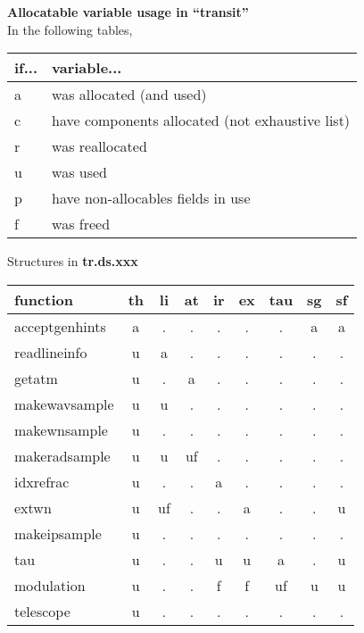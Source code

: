 \documentclass{article}
\begin{document}
\begin{center}
{\large {\bf Allocatable variable usage in ``transit''}}\\[1cm]
In the following tables, \\
\begin{tabular}{ll}
if... & variable...\\
\hline
a & was allocated (and used) \\
c & have components allocated (not exhaustive list) \\
r & was reallocated \\
u & was used \\
p & have non-allocables fields in use \\
f & was freed \\
\end{tabular}
\end{center}

\vspace{1cm}

\begin{center}
{\large Structures in {\bf tr.ds.xxx}}\\[1cm]
\begin{tabular}{l|cccccccc}
function
  & th & li & at & ir & ex & tau & sg & sf \\
\hline
acceptgenhints
  & a  & .  & .  & .  & .  & .   & a  & a  \\
readlineinfo
  & u  & a  & .  & .  & .  & .   & .  & .  \\
getatm
  & u  & .  & a  & .  & .  & .   & .  & .  \\
makewavsample
  & u  & u  & .  & .  & .  & .   & .  & .  \\
makewnsample
  & u  & .  & .  & .  & .  & .   & .  & .  \\
makeradsample
  & u  & u  & uf & .  & .  & .   & .  & .  \\
idxrefrac
  & u  & .  & .  & a  & .  & .   & .  & .  \\
extwn
  & u  & uf & .  & .  & a  & .   & .  & u  \\
makeipsample
  & u  & .  & .  & .  & .  & .   & .  & .  \\
tau
  & u  & .  & .  & u  & u  & a   & .  & u  \\
modulation
  & u  & .  & .  & f  & f  & uf  & u  & u  \\
telescope
  & u  & .  & .  & .  & .  & .   & .  & .  \\
\hline
\end{tabular}
\end{center}
\end{document}
